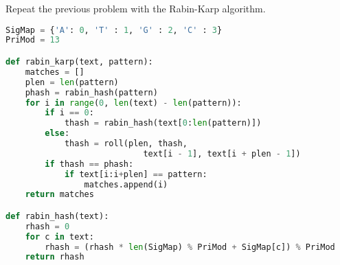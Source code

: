 \documentclass[12pt]{article}
\newenvironment{problem}[2][Problem]{\begin{trivlist}
\item[\hskip \labelsep {\bfseries #1}\hskip \labelsep {\bfseries #2.}]}{\end{trivlist}}
\begin{document}
\begin{problem}{2} %
    Repeat the previous problem with the Rabin-Karp algorithm.
\begin{lstlisting}[language=Python, caption=Rabin-Karp algorithm]
SigMap = {'A': 0, 'T' : 1, 'G' : 2, 'C' : 3}
PriMod = 13

def rabin_karp(text, pattern):
    matches = []
    plen = len(pattern)
    phash = rabin_hash(pattern)
    for i in range(0, len(text) - len(pattern)):
        if i == 0:
            thash = rabin_hash(text[0:len(pattern)])
        else:
            thash = roll(plen, thash, 
                            text[i - 1], text[i + plen - 1])
        if thash == phash:
            if text[i:i+plen] == pattern:
                matches.append(i)
    return matches

def rabin_hash(text):
    rhash = 0
    for c in text:
        rhash = (rhash * len(SigMap) % PriMod + SigMap[c]) % PriMod
    return rhash


\end{lstlisting}
\end{problem}
\end{document}
